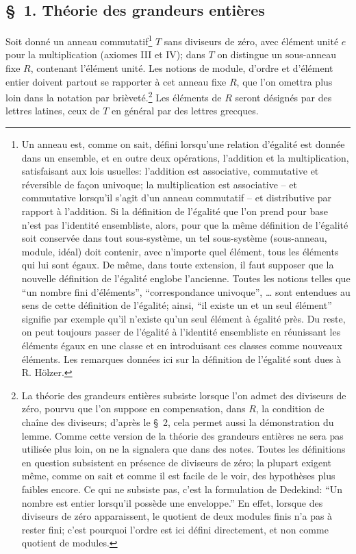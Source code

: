 
\subsection*{\S~1. Théorie des grandeurs entières}

Soit donné un anneau commutatif\footnote{Un anneau est, comme on sait, défini lorsqu'une relation d'égalité est donnée dans un ensemble, et en outre deux opérations, l'addition et la multiplication, satisfaisant aux lois usuelles: l'addition est associative, commutative et réversible de façon univoque; la multiplication est associative -- et commutative lorsqu'il s'agit d'un anneau commutatif -- et distributive par rapport à l'addition. Si la définition de l'égalité que l'on prend pour base n'est pas l'identité ensembliste, alors, pour que la même définition de l'égalité soit conservée dans tout sous-système, un tel sous-système (sous-anneau, module, idéal) doit contenir, avec n'importe quel élément, tous les éléments qui lui sont égaux. De même, dans toute extension, il faut supposer que la nouvelle définition de l'égalité englobe l'ancienne. Toutes les notions telles que ``un nombre fini d'éléments'', ``correspondance univoque'', \dots{} sont entendues au sens de cette définition de l'égalité; ainsi, ``il existe un et un seul élément'' signifie par exemple qu'il n'existe qu'un seul élément à égalité près. Du reste, on peut toujours passer de l'égalité à l'identité ensembliste en réunissant les éléments égaux en une classe et en introduisant ces classes comme nouveaux éléments. Les remarques données ici sur la définition de l'égalité sont dues à R. Hölzer.} $T$ sans diviseurs de zéro, avec élément unité $e$ pour la multiplication (axiomes III et IV); dans $T$ on distingue un sous-anneau fixe $R$, contenant l'élément unité. Les notions de module, d'ordre et d'élément entier doivent partout se rapporter à cet anneau fixe $R$, que l'on omettra plus loin dans la notation par brièveté.\footnote{La théorie des grandeurs entières subsiste lorsque l'on admet des diviseurs de zéro, pourvu que l'on suppose en compensation, dans $R$, la condition de chaîne des diviseurs; d'après le \S~2, cela permet aussi la démonstration du lemme. Comme cette version de la théorie des grandeurs entières ne sera pas utilisée plus loin, on ne la signalera que dans des notes. Toutes les définitions en question subsistent en présence de diviseurs de zéro; la plupart exigent même, comme on sait et comme il est facile de le voir, des hypothèses plus faibles encore. Ce qui ne subsiste pas, c'est la formulation de Dedekind: ``Un nombre est entier lorsqu'il possède une enveloppe.'' En effet, lorsque des diviseurs de zéro apparaissent, le quotient de deux modules finis n'a pas à rester fini; c'est pourquoi l'ordre est ici défini directement, et non comme quotient de modules.} Les éléments de $R$ seront désignés par des lettres latines, ceux de $T$ en général par des lettres grecques.

